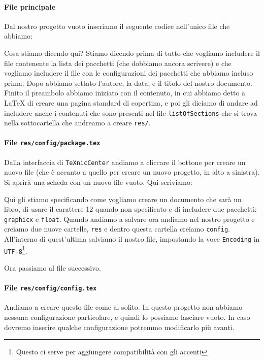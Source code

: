 \paragraph*{File principale} Dal nostro progetto vuoto inseriamo il seguente
codice nell'unico file che abbiamo:



\noindent Cosa stiamo dicendo qui? Stiamo dicendo prima di tutto che vogliamo
includere il file contenente la lista dei pacchetti (che dobbiamo ancora
scrivere) e che vogliamo includere il file con le configurazioni dei pacchetti
che abbiamo incluso prima. Dopo abbiamo settato l'autore, la data, e il titolo
del nostro documento.
Finito il preambolo abbiamo iniziato con il contenuto, in cui abbiamo detto a
\LaTeX{} di creare una pagina standard di copertina, e poi gli diciamo di
andare ad includere anche i contenuti che sono presenti nel file
\texttt{listOfSections} che si trova nella sottocartella che andreamo a creare
\texttt{res/}.

\paragraph*{File \texttt{res/config/package.tex}} Dalla interfaccia di
\texttt{TeXnicCenter} andiamo a cliccare il bottone per creare un nuovo file
(che è accanto a quello per creare un nuovo progetto, in alto a sinistra). Si
aprirà una scheda con un nuovo file vuoto. Qui scriviamo:



\noindent Qui gli stiamo specificando come vogliamo creare un documento che
sarà un libro, di usare il carattere 12 quando non specificato e di includere
due pacchetti: \texttt{graphicx} e \texttt{float}.
Quando andiamo a salvare ora andiamo nel nostro progetto e creiamo due nuove
cartelle, \texttt{res} e dentro questa cartella creiamo \texttt{config}.
All'interno di quest'ultima salviamo il nostro file, impostando la voce
\texttt{Encoding} in \texttt{UTF-8}\footnote{Questo ci serve per aggiungere
compatibilità con gli accenti}.

Ora passiamo al file successivo.

\paragraph*{File \texttt{res/config/config.tex}} Andiamo a creare questo file
come al solito. In questo progetto non abbiamo nessuna configurazione
particolare, e quindi lo possiamo lasciare vuoto. In caso dovremo inserire
qualche configurazione potremmo modificarlo più avanti.

